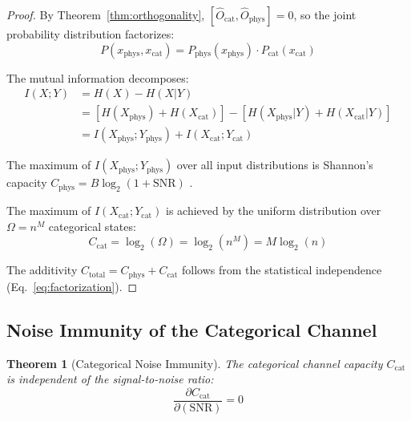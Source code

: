 \documentclass[twocolumn,10pt]{article}
\newtheorem{theorem}{Theorem}[section]
\theoremstyle{remark}
\newcommand{\Ocat}{\hat{O}_{\mathrm{cat}}}
\newcommand{\Ophys}{\hat{O}_{\mathrm{phys}}}
\newcommand{\Ccat}{C_{\mathrm{cat}}}
\newcommand{\Cphys}{C_{\mathrm{phys}}}
\begin{document}
\begin{proof}
By Theorem~\ref{thm:orthogonality}, $[\Ocat, \Ophys] = 0$, so the joint probability distribution factorizes:
\begin{equation}
    P(x_{\mathrm{phys}}, x_{\mathrm{cat}}) = P_{\mathrm{phys}}(x_{\mathrm{phys}}) \cdot P_{\mathrm{cat}}(x_{\mathrm{cat}})
    \label{eq:factorization}
\end{equation}

The mutual information decomposes:
\begin{align}
    I(X; Y) &= H(X) - H(X|Y) \nonumber \\
    &= [H(X_{\mathrm{phys}}) + H(X_{\mathrm{cat}})] - [H(X_{\mathrm{phys}}|Y) + H(X_{\mathrm{cat}}|Y)] \nonumber \\
    &= I(X_{\mathrm{phys}}; Y_{\mathrm{phys}}) + I(X_{\mathrm{cat}}; Y_{\mathrm{cat}})
\end{align}

The maximum of $I(X_{\mathrm{phys}}; Y_{\mathrm{phys}})$ over all input distributions is Shannon's capacity $\Cphys = B\log_2(1 + \mathrm{SNR})$ \cite{shannon1948, cover2006}.

The maximum of $I(X_{\mathrm{cat}}; Y_{\mathrm{cat}})$ is achieved by the uniform distribution over $\Omega = n^M$ categorical states:
\begin{equation}
    \Ccat = \log_2(\Omega) = \log_2(n^M) = M \log_2(n)
\end{equation}

The additivity $C_{\mathrm{total}} = \Cphys + \Ccat$ follows from the statistical independence (Eq.~\ref{eq:factorization}).
\end{proof}

\subsection{Noise Immunity of the Categorical Channel}

\begin{theorem}[Categorical Noise Immunity]
\label{thm:noise_immunity}
The categorical channel capacity $\Ccat$ is independent of the signal-to-noise ratio:
\begin{equation}
    \frac{\partial \Ccat}{\partial (\mathrm{SNR})} = 0
    \label{eq:noise_immunity}
\end{equation}
\end{theorem}
\end{document}
